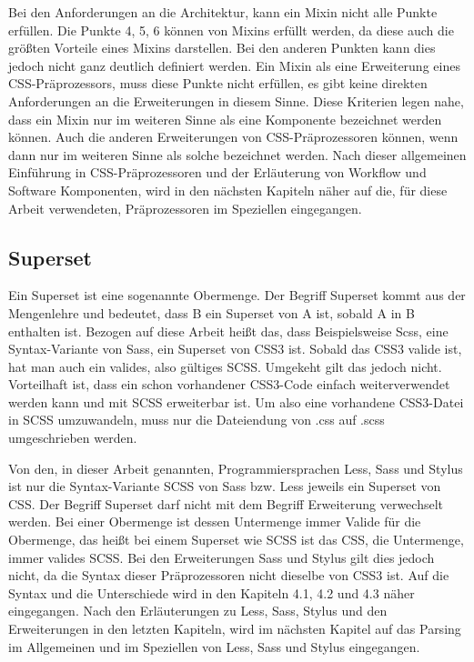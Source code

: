 Bei den Anforderungen an die Architektur, kann ein Mixin nicht alle Punkte erfüllen. Die Punkte 4, 5, 6 können von Mixins erfüllt werden, da diese auch die größten Vorteile eines Mixins darstellen. Bei den anderen Punkten kann dies jedoch nicht ganz deutlich definiert werden. \newline
Ein Mixin als eine Erweiterung eines CSS-Präprozessors, muss diese Punkte nicht erfüllen, es gibt keine direkten Anforderungen an die Erweiterungen in diesem Sinne.\newline
Diese Kriterien legen nahe, dass ein Mixin nur im weiteren Sinne als eine Komponente bezeichnet werden können. Auch die anderen Erweiterungen von CSS-Präprozessoren können, wenn dann nur im weiteren Sinne als solche bezeichnet werden.\newline\newline
Nach dieser allgemeinen Einführung in CSS-Präprozessoren und der Erläuterung von Workflow und Software Komponenten, wird in den nächsten Kapiteln näher auf die, für diese Arbeit verwendeten, Präprozessoren im Speziellen eingegangen.
\newpage
\subsection{Superset} 
Ein Superset ist eine sogenannte Obermenge. Der Begriff Superset kommt aus der Mengenlehre und bedeutet, dass B ein Superset von A ist, sobald A in B enthalten ist. Bezogen auf diese Arbeit heißt das, dass Beispielsweise Scss, eine Syntax-Variante von Sass, ein Superset von CSS3 ist.\newline
Sobald das CSS3 valide ist, hat man auch ein valides, also gültiges SCSS. Umgekeht gilt das jedoch nicht.  Vorteilhaft ist, dass ein schon vorhandener CSS3-Code einfach weiterverwendet werden kann und mit SCSS erweiterbar ist. Um also eine vorhandene CSS3-Datei in SCSS umzuwandeln, muss nur die Dateiendung von .css auf .scss umgeschrieben werden.

Von den, in dieser Arbeit genannten, Programmiersprachen Less, Sass und Stylus ist nur die Syntax-Variante SCSS von Sass bzw. Less jeweils ein Superset von CSS. \newline
Der Begriff Superset darf nicht mit dem Begriff Erweiterung verwechselt werden.\newline
Bei einer Obermenge ist dessen Untermenge immer Valide für die Obermenge, das heißt bei einem Superset wie SCSS ist das CSS, die Untermenge, immer valides SCSS.\newline
Bei den Erweiterungen Sass und Stylus gilt dies jedoch nicht, da die Syntax dieser Präprozessoren nicht dieselbe von CSS3 ist. Auf die Syntax und die Unterschiede wird in den Kapiteln 4.1, 4.2 und 4.3 näher eingegangen.\newline\newline
Nach den Erläuterungen zu Less, Sass, Stylus und den Erweiterungen in den letzten Kapiteln, wird im nächsten Kapitel auf das Parsing im Allgemeinen und im Speziellen von Less, Sass und Stylus eingegangen.

